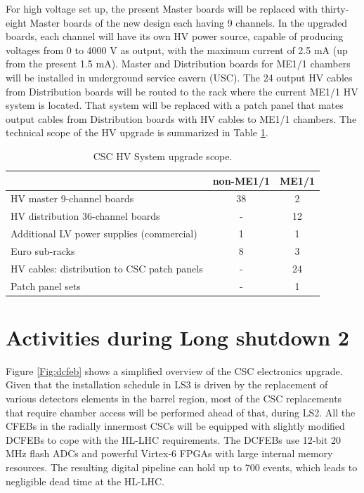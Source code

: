 For high voltage set up, the present
Master boards will be replaced with thirty-eight Master boards of the new design each having 9 channels.
In the upgraded boards, each channel will have its own HV power source, capable of producing
voltages from 0 to 4000 V as output, with the maximum current of 2.5 mA (up from the present 1.5 mA). Master and Distribution boards for ME1/1 chambers will be installed in underground service cavern (USC).
The 24 output HV cables from Distribution boards will be routed to the rack where the current
ME1/1 HV system is located. That system will be replaced with a patch panel that mates output cables from Distribution boards with HV cables to ME1/1 chambers.
The technical scope of
the HV upgrade is summarized in Table \ref{hv_scope}.

\begin{table}[!htb]
\begin{center}
    \begin{tabular}{ | l | c | c | }  \hline
    &  non-ME1/1      & ME1/1         \\ \hline \hline
   HV master 9-channel boards &  38  &  2 \\
   HV distribution 36-channel boards &  -  &  12 \\
   Additional LV power supplies (commercial) & 1  &  1 \\
   Euro sub-racks &  8  &  3   \\ %
   HV cables: distribution to CSC patch panels &  -  &  24 \\
   Patch panel sets &  -  &  1    \\ \hline \hline
    \end{tabular}
    \caption{CSC HV System upgrade scope.}
    \label{hv_scope}
\end{center}
\end{table}


\section{Activities during Long shutdown 2}
Figure \ref{Fig:dcfeb} shows a simplified overview of the CSC electronics upgrade. Given that the installation schedule in LS3 is driven by the replacement of various detectors elements in the barrel region, most of the CSC replacements that require chamber access will be performed ahead of that, during LS2.
All the CFEBs in the radially innermost CSCs will be equipped with slightly modified DCFEBs to cope with the HL-LHC requirements. 
The DCFEBs use 12-bit 20 MHz flash ADCs and powerful Virtex-6 FPGAs with large internal memory resources. The resulting digital pipeline can hold up to 700 events, which leads to negligible dead time at the HL-LHC.

